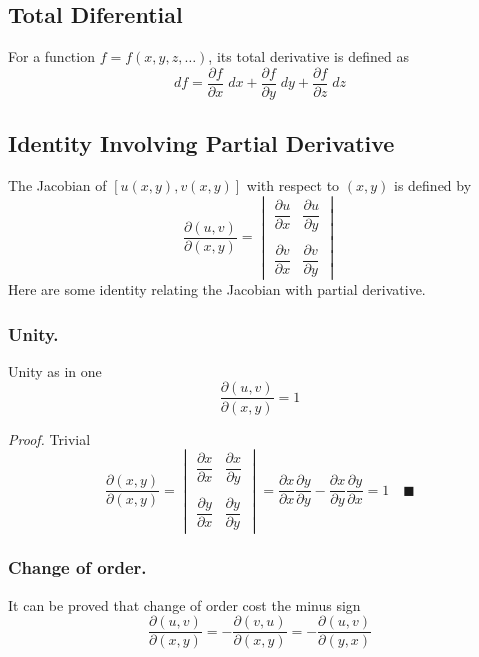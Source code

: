 \documentclass[../../../main.tex]{subfiles}
\begin{document}
\subsection{Total Diferential}
For a function $f=f(x,y,z,\dots)$, its total derivative is defined as
\begin{equation*}
    df=\frac{\partial f}{\partial x}\;dx + \frac{\partial f}{\partial y}\;dy  + \frac{\partial f}{\partial z}\;dz
\end{equation*}
\subsection{Identity Involving Partial Derivative}
The Jacobian of $[u(x,y), v(x,y)]$ with respect to $(x, y)$ is defined by
\begin{equation*}
    \frac{\partial (u,v)}{\partial (x,y)}=\begin{vmatrix}
        \dfrac{\partial u}{\partial x} & \dfrac{\partial u}{\partial y} \\
        \\
        \dfrac{\partial v}{\partial x} & \dfrac{\partial v}{\partial y}
    \end{vmatrix}
\end{equation*}
Here are some identity relating the Jacobian with partial derivative.

\subsubsection{Unity.} Unity as in one
\begin{equation*}
    \frac{\partial (u,v)}{\partial (x,y)}=1
\end{equation*}

\emph{Proof.} Trivial
\begin{equation*}
    \frac{\partial (x,y)}{\partial (x,y)}=\begin{vmatrix}
        \dfrac{\partial x}{\partial x} & \dfrac{\partial x}{\partial y} \\
        \\
        \dfrac{\partial y}{\partial x} & \dfrac{\partial y}{\partial y}
    \end{vmatrix}=\dfrac{\partial x}{\partial x} \dfrac{\partial y}{\partial y}-   \dfrac{\partial x}{\partial y}\dfrac{\partial y}{\partial x}  =1\quad\blacksquare
\end{equation*}

\subsubsection{Change of order.} It can be proved that change of order cost the minus sign
\begin{equation*}
    \frac{\partial (u,v)}{\partial (x,y)}=- \frac{\partial (v,u)}{\partial (x,y)}= -\frac{\partial (u,v)}{\partial (y,x)}
\end{equation*}
\end{document}
